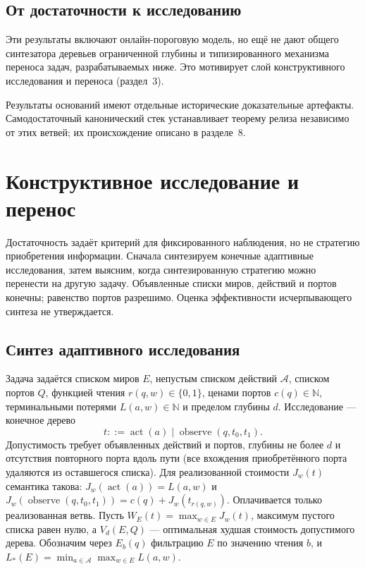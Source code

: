 \documentclass[10pt,a4paper]{article}
\newcommand{\Nat}{\mathbb N}
\begin{document}
\subsection{От достаточности к исследованию}
Эти результаты включают онлайн-пороговую модель, но ещё не дают общего синтезатора деревьев ограниченной глубины и типизированного механизма переноса задач, разрабатываемых ниже. Это мотивирует слой конструктивного исследования и переноса (раздел~3).

Результаты оснований имеют отдельные исторические доказательные артефакты. Самодостаточный канонический стек устанавливает теорему релиза независимо от этих ветвей; их происхождение описано в разделе~8.
\clearpage
\section{Конструктивное исследование и перенос}\label{sec:investigation}
Достаточность задаёт критерий для фиксированного наблюдения, но не стратегию приобретения информации. Сначала синтезируем конечные адаптивные исследования, затем выясним, когда синтезированную стратегию можно перенести на другую задачу. Объявленные списки миров, действий и портов конечны; равенство портов разрешимо. Оценка эффективности исчерпывающего синтеза не утверждается.

\subsection{Синтез адаптивного исследования}
Задача задаётся списком миров $E$, непустым списком действий $\mathcal A$, списком портов $Q$, функцией чтения $r(q,w)\in\{0,1\}$, ценами портов $c(q)\in\Nat$, терминальными потерями $L(a,w)\in\Nat$ и пределом глубины $d$. Исследование --- конечное дерево
\[
 t ::= \operatorname{act}(a)\mid\operatorname{observe}(q,t_0,t_1).
\]
Допустимость требует объявленных действий и портов, глубины не более $d$ и отсутствия повторного порта вдоль пути (все вхождения приобретённого порта удаляются из оставшегося списка). Для реализованной стоимости $J_w(t)$ семантика такова: $J_w(\operatorname{act}(a))=L(a,w)$ и $J_w(\operatorname{observe}(q,t_0,t_1))=c(q)+J_w(t_{r(q,w)})$. Оплачивается только реализованная ветвь. Пусть $W_E(t)=\max_{w\in E}J_w(t)$, максимум пустого списка равен нулю, а $V_d(E,Q)$ --- оптимальная худшая стоимость допустимого дерева. Обозначим через $E_b(q)$ фильтрацию $E$ по значению чтения $b$, и $L_*(E)=\min_{a\in\mathcal A}\max_{w\in E}L(a,w)$.
\end{document}
